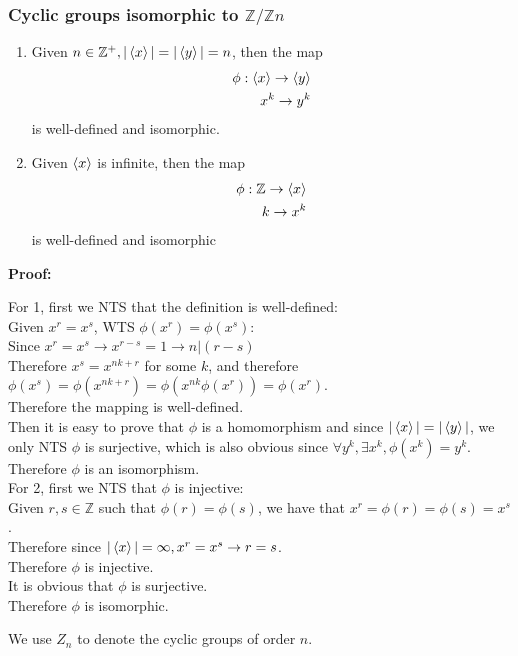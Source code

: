 \documentclass{article}
\begin{document}
\subsubsection*{Cyclic groups isomorphic to $\mathbb{Z}/\mathbb{Z}n$}
\begin{enumerate}
    \item Given $n \in \mathbb{Z}^+, |\braket{x}| = |\braket{y}| = n$, then the map
    \begin{equation*}
        \begin{split}
            \phi: \braket{x} \rightarrow \braket{y}\\
            x^k \rightarrow y^k
        \end{split}
    \end{equation*}
    is well-defined and isomorphic.
    \item Given $\braket{x}$ is infinite, then the map
    \begin{equation*}
        \begin{split}
            \phi: \mathbb{Z} \rightarrow \braket{x}\\
            k \rightarrow x^k
        \end{split}
    \end{equation*}
    is well-defined and isomorphic
\end{enumerate}
\textbf{Proof:}
\begin{addmargin}[1em]{0em}
    For 1, first we NTS that the definition is well-defined:\\
    Given $x^r = x^s$, WTS $\phi(x^r) = \phi(x^s)$:\\
    Since $x^r = x^s \rightarrow x^{r-s} = 1 \rightarrow n|(r-s)$\\
    Therefore $x^s = x^{nk+r}$ for some $k$, and therefore $\phi(x^s) = \phi(x^{nk+r}) = \phi(x^{nk}\phi(x^r)) = \phi(x^r)$.\\
    Therefore the mapping is well-defined.\\
    Then it is easy to prove that $\phi$ is a homomorphism and since $|\braket{x}| = |\braket{y}|$, we only NTS $\phi$ is surjective, which is also obvious since $\forall y^k, \exists x^k, \phi(x^k) = y^k$.\\
    Therefore $\phi$ is an isomorphism.\\
    For 2, first we NTS that $\phi$ is injective:\\
    Given $r, s \in \mathbb{Z}$ such that $\phi(r) = \phi(s)$, we have that $x^r = \phi(r) = \phi(s) = x^s$.\\
    Therefore since $|\braket{x}| = \infty, x^r = x^s \rightarrow r = s$.\\
    Therefore $\phi$ is injective.\\
    It is obvious that $\phi$ is surjective.\\
    Therefore $\phi$ is isomorphic.
\end{addmargin}
We use $Z_n$ to denote the cyclic groups of order $n$.
\end{document}
